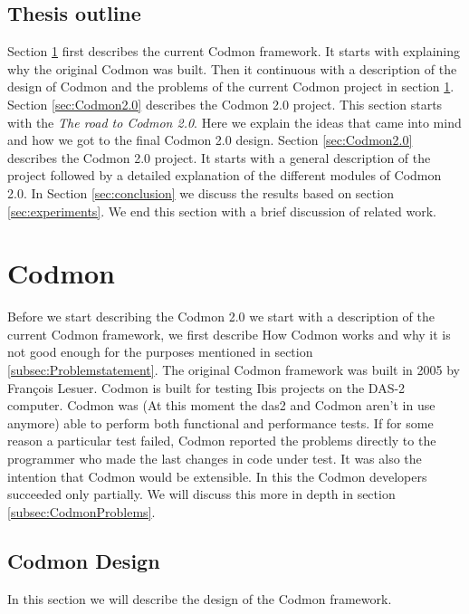 \documentclass[a4paper,10pt]{scrartcl}
\newcommand{\project}{Codmon 2.0}
\begin{document}
\subsection{Thesis outline}
\label{subsec:Thesisoutline}
Section \ref{sec:codmon} first describes the current Codmon framework. It starts with explaining why the original Codmon was built. Then it continuous with a description of the design of Codmon
and the problems of the current Codmon project in section \ref{sec:codmon}. Section \ref{sec:Codmon2.0} describes the \project{} project. This section starts with the \emph{The road 
to \project{}}. Here we explain the ideas that came into mind and how we got to the final \project{} design. Section \ref{sec:Codmon2.0} describes the \project{} project. It starts with 
a general description of the project followed by a detailed explanation of the different modules of \project{}. In Section \ref{sec:conclusion} we discuss the results based on section \ref{sec:experiments}. We end this section with a brief discussion of related work.

\newpage

\section{Codmon}
\label{sec:codmon}
Before we start describing the \project{} we start with a description of the current Codmon framework, we first describe How Codmon works and why it is not good enough for the purposes mentioned
in section \ref{subsec:Problemstatement}. The original Codmon framework was built in 2005 by François Lesuer\cite{Codmon}. Codmon is built for testing Ibis projects\cite{Ibis}\cite{Satin}\cite{MPJ}\cite{IPL}\cite{GMI} 
on the DAS-2\cite{das2} computer. Codmon was (At this moment the das2 and Codmon aren't in use anymore) able to perform both functional and performance tests. If for some reason a particular
test failed, Codmon reported the problems directly to the programmer who made the last changes in code under test. It was also the intention that Codmon would be extensible. In this the Codmon 
developers succeeded only partially. We will discuss this more in depth in section \ref{subsec:CodmonProblems}.  

\subsection{Codmon Design}
\label{subsec:CodmonDesign}
In this section we will describe the design of the Codmon framework. 
\end{document}
